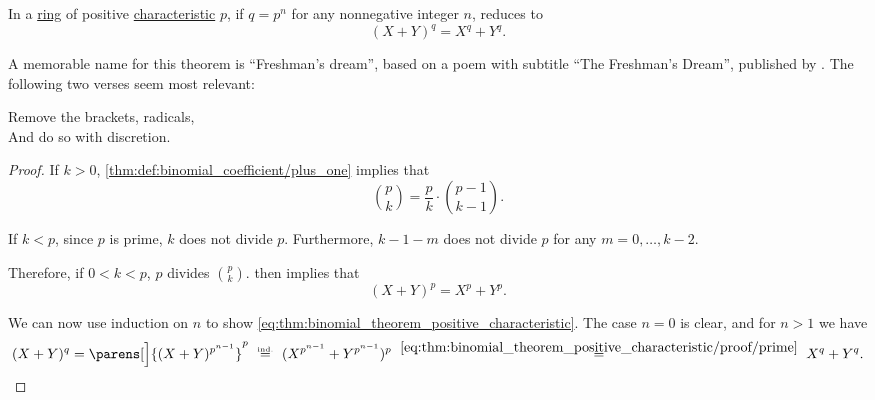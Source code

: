 \begin{corollary}\label{thm:binomial_theorem_positive_characteristic}
  In a \hyperref[def:ring]{ring} of positive \hyperref[def:ring_characteristic]{characteristic} \( p \), if \( q = p^n \) for any nonnegative integer \( n \),  reduces to
  \begin{equation}\label{eq:thm:binomial_theorem_positive_characteristic}
    (X + Y)^q = X^q + Y^q.
  \end{equation}
\end{corollary}
\begin{comments}
  \item A memorable name for this theorem is \enquote{Freshman's dream}, based on a poem with subtitle \enquote{The Freshman's Dream}, published by . The following two verses seem most relevant:
  \begin{displayquote}
    Remove the brackets, radicals, \\
    And do so with discretion.
  \end{displayquote}
\end{comments}
\begin{proof}
  If \( k > 0 \), \cref{thm:def:binomial_coefficient/plus_one} implies that
  \begin{equation*}
    \binom p k = \frac p k \cdot \binom {p - 1} {k - 1}.
  \end{equation*}

  If \( k < p \), since \( p \) is prime, \( k \) does not divide \( p \). Furthermore, \( k - 1 - m \) does not divide \( p \) for any \( m = 0, \ldots, k - 2 \).

  Therefore, if \( 0 < k < p \), \( p \) divides \( \binom p k \).  then implies that
  \begin{equation}\label{eq:thm:binomial_theorem_positive_characteristic/proof/prime}
    (X + Y)^p = X^p + Y^p.
  \end{equation}

  We can now use induction on \( n \) to show \eqref{eq:thm:binomial_theorem_positive_characteristic}. The case \( n = 0 \) is clear, and for \( n > 1 \) we have
  \begin{equation*}
    (X + Y)^q
    =
    \parens[\Big]{ (X + Y)^{p^{n-1}} }^p
    \reloset {\T{ind.}} =
    (X^{p^{n-1}} + Y^{p^{n-1}})^p
    \reloset {\eqref{eq:thm:binomial_theorem_positive_characteristic/proof/prime}} =
    X^q + Y^q.
  \end{equation*}
\end{proof}

